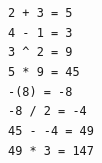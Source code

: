 \texttt{2 + 3 = 5} \\
\texttt{4 - 1 = 3} \\
\texttt{3 \^{} 2 = 9} \\
\texttt{5 * 9 = 45} \\
\texttt{-(8) = -8} \\
\texttt{-8 / 2 = -4} \\
\texttt{45 - -4 = 49} \\
\texttt{49 * 3 = 147}
